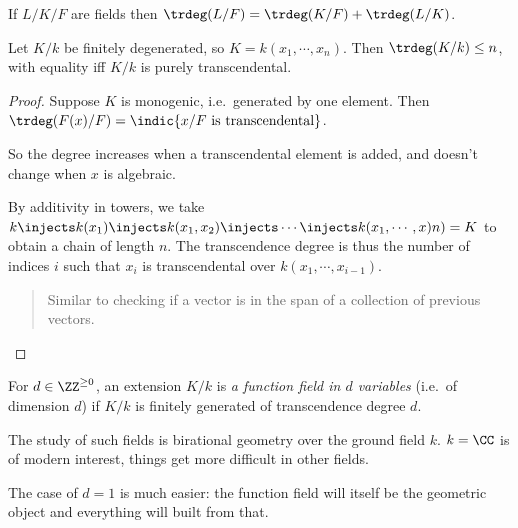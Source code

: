 \begin{theorem}

If \(L/K/F\) are fields then
\(\trdeg(L/F) = \trdeg(K/F) + \trdeg(L/K)\).

\end{theorem}

\begin{theorem}

Let \(K/k\) be finitely degenerated, so \(K = k(x_1, \cdots, x_n)\).
Then \(\trdeg(K/k) \leq n\), with equality iff \(K/k\) is purely
transcendental.

\end{theorem}

\begin{proof}

Suppose \(K\) is monogenic, i.e.~generated by one element. Then
\(\trdeg(F(x)/F) = \indic{x/F\text{ is transcendental}}\).

So the degree increases when a transcendental element is added, and
doesn't change when \(x\) is algebraic.

By additivity in towers, we take
\(k \injects k(x_1) \injects k(x_1, x_2) \injects \cdots \injects k(x_1, \cdots, x)n) = K\)
to obtain a chain of length \(n\). The transcendence degree is thus the
number of indices \(i\) such that \(x_i\) is transcendental over
\(k(x_1, \cdots, x_{i-1})\).

\begin{quote}
Similar to checking if a vector is in the span of a collection of
previous vectors.
\end{quote}

\end{proof}

\begin{definition}

For \(d\in\ZZ^{\geq 0}\), an extension \(K/k\) is \emph{a function field
in \(d\) variables} (i.e.~of dimension \(d\)) if \(K/k\) is finitely
generated of transcendence degree \(d\).

\end{definition}

The study of such fields is birational geometry over the ground field
\(k\). \(k=\CC\) is of modern interest, things get more difficult in
other fields.

The case of \(d=1\) is much easier: the function field will itself be
the geometric object and everything will built from that.

